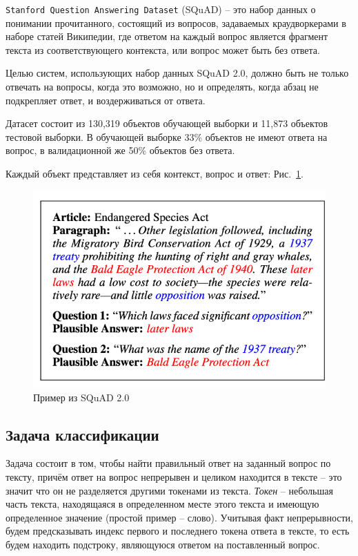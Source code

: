 \documentclass{article}
\begin{document}
\texttt{Stanford Question Answering Dataset} (SQuAD) -- это набор данных о понимании прочитанного, состоящий из вопросов, задаваемых краудворкерами в наборе статей Википедии, где ответом на каждый вопрос является фрагмент текста из соответствующего контекста, или вопрос может быть без ответа.

Целью систем, использующих набор данных SQuAD 2.0, должно быть не только отвечать на вопросы, когда это возможно, но и определять, когда абзац не подкрепляет ответ, и воздерживаться от ответа.

Датасет состоит из 130,319 объектов обучающей выборки и 11,873 объектов тестовой выборки. В обучающей выборке 33\% объектов не имеют ответа на вопрос, в валидационной же 50\% объектов без ответа.

Каждый объект представляет из себя контекст, вопрос и ответ: Рис.~\ref{fig:squad}.

\begin{figure}[!ht]
    \centering
    \includegraphics[width=150mm]{../figures/squad_example.png}
    \caption{Пример из SQuAD 2.0}
    \label{fig:squad}
\end{figure}

\subsection{Задача классификации}

Задача состоит в том, чтобы найти правильный ответ на заданный вопрос по тексту, 
причём ответ на вопрос непрерывен и целиком находится в тексте -- это значит что он не разделяется
другими токенами из текста. \textit{Токен} -- небольшая часть текста, 
находящаяся в определенном месте этого текста и имеющую определенное значение (простой пример -- слово).
Учитывая факт непрерывности, будем предсказывать индекс первого и последнего токена ответа в тексте,
то есть будем находить подстроку, являющуюся ответом на поставленный вопрос.
\end{document}
